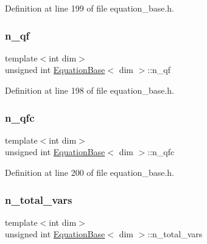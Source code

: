 Definition at line 199 of file equation\+\_\+base.\+h.

\mbox{\label{class_equation_base_ad0bad2bd155657e65a923910e5b114aa}} 
\subsubsection{\texorpdfstring{n\+\_\+qf}{n\_qf}}
{\footnotesize\ttfamily template$<$int dim$>$ \\
unsigned int \hyperlink{class_equation_base}{Equation\+Base}$<$ dim $>$\+::n\+\_\+qf\hspace{0.3cm}{\ttfamily [protected]}}



Definition at line 198 of file equation\+\_\+base.\+h.

\mbox{\label{class_equation_base_a5cb013018da03250a101941f196df23b}} 
\subsubsection{\texorpdfstring{n\+\_\+qfc}{n\_qfc}}
{\footnotesize\ttfamily template$<$int dim$>$ \\
unsigned int \hyperlink{class_equation_base}{Equation\+Base}$<$ dim $>$\+::n\+\_\+qfc\hspace{0.3cm}{\ttfamily [protected]}}



Definition at line 200 of file equation\+\_\+base.\+h.

\mbox{\label{class_equation_base_a505c44d58215a614d263615a53159fda}} 
\subsubsection{\texorpdfstring{n\+\_\+total\+\_\+vars}{n\_total\_vars}}
{\footnotesize\ttfamily template$<$int dim$>$ \\
unsigned int \hyperlink{class_equation_base}{Equation\+Base}$<$ dim $>$\+::n\+\_\+total\+\_\+vars\hspace{0.3cm}{\ttfamily [protected]}}



